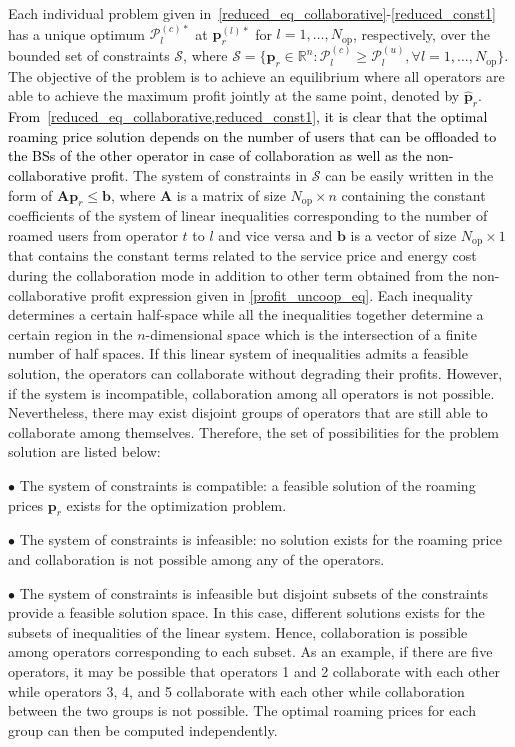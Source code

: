 \documentclass[10pt, letter, twocolumn]{IEEEtran}
\begin{document}
Each individual problem given in~\eqref{reduced_eq_collaborative}-\eqref{reduced_const1} has a unique optimum $\mathcal{P}_l^{(c)*}$ at $\mathbf{p}_{r}^{(l)*}$ for $l = 1, \ldots, N_{\text{op}}$, respectively, over the bounded set of constraints  $\mathcal{S}$, where $\mathcal{S}=\{\mathbf{p}_{r}\in \mathbb{R}^{n} : \mathcal{P}_{l}^{(c)} \geq \mathcal{P}_{l}^{(u)}, \forall l = 1,\ldots, N_{\text{op}} \}$. The objective of the problem is to achieve an equilibrium where all operators are able to achieve the maximum profit jointly at the same point, denoted by $\hat{\mathbf{p}}_{r}$. \textcolor{black}{From~\cref{reduced_eq_collaborative,reduced_const1}, it is clear that the optimal roaming price solution depends on the number of users that can be offloaded to the BSs of the other operator in case of collaboration as well as the non-collaborative profit}. The system of constraints in $\mathcal{S}$ can be easily written in the form of $\mathbf{A} \mathbf{p}_{r} \leq \mathbf{b}$, where $\mathbf{A}$ is a matrix of size $N_{\text{op}} \times n$ containing the constant coefficients of the system of linear inequalities corresponding to the number of roamed users from operator $t$ to $l$ and vice versa and $\mathbf{b}$ is a vector of size $N_{\text{op}} \times 1$ that contains the constant terms related to the service price and energy cost during the collaboration mode in addition to other term obtained from the non-collaborative profit expression given in \eqref{profit_uncoop_eq}. Each inequality determines a certain half-space while all the inequalities together determine a certain region in the $n$-dimensional space which is the intersection of a finite number of half spaces. If this linear system of inequalities admits a feasible solution, the operators can collaborate without degrading their profits. However, if the system is incompatible, collaboration among all operators is not possible. Nevertheless, there may exist disjoint groups of operators that are still able to collaborate among themselves. Therefore, the set of possibilities for the problem solution are listed below:

$\bullet$ The system of constraints is compatible: a feasible solution of the roaming prices $\mathbf{p}_{r}$ exists for the optimization problem.

$\bullet$ The system of constraints is infeasible: no solution exists for the roaming price and collaboration is not possible among any of the operators.

$\bullet$ The system of constraints is infeasible but disjoint subsets of the constraints provide a feasible solution space. In this case, different solutions exists for the subsets of inequalities of the linear system. Hence, collaboration is possible among operators corresponding to each subset. As an example, if there are five operators, it may be possible that operators 1 and 2 collaborate with each other while operators 3, 4, and 5 collaborate with each other while collaboration between the two groups is not possible. The optimal roaming prices for each group can then be computed independently.
\end{document}
